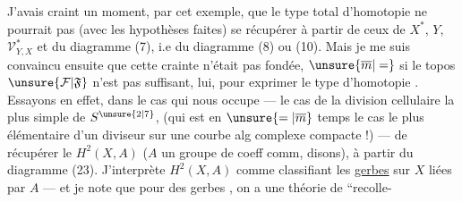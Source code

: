 J'avais craint un moment, par cet exemple,
que le type total d'homotopie  ne pourrait
pas (avec les hypothèses  faites) se récupérer
à partir de ceux de $X^*$, $Y$, $\mathcal V^*_{Y,X}$ et du
diagramme (7), i.e du diagramme (8)
ou (10). Mais je me suis convaincu ensuite
que cette crainte n'était pas fondée, $\unsure{\overline m|=}$ si
le topos $\unsure{\mathcal F|\mathfrak F}$ n'est pas suffisant, lui, pour
exprimer le type d'homotopie .
Essayons en effet, dans le cas qui nous
occupe --- le cas de la division cellulaire
la plus simple de $S^{\unsure{2|7}}$, (qui est en $\unsure{=|\overline m}$ temps
le cas le plus  élémentaire d'un
diviseur sur une courbe alg complexe
compacte !) --- de récupérer le $H^2(X,A)$
($A$ un groupe de coeff comm, disons),
à partir du diagramme (23). J'interprète
$H^2(X,A)$ comme classifiant les \uline{gerbes} sur
$X$ liées par $A$ --- et je note que pour des
 gerbes , on a une théorie de ``recolle-
